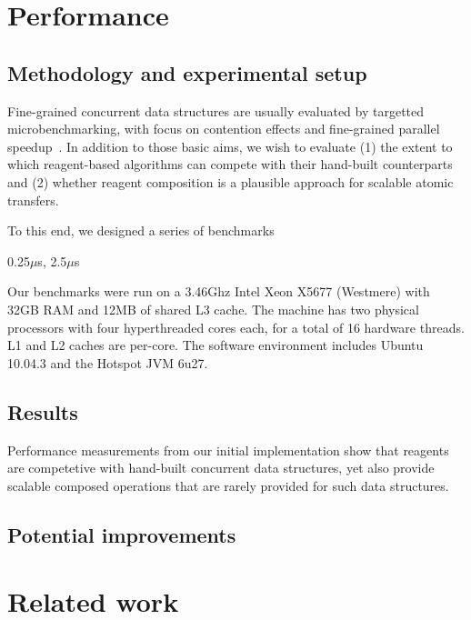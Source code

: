 \documentclass[preprint,nocopyrightspace]{sigplanconf}
\begin{document}
\section{Performance}
\label{sec:performance}

\subsection{Methodology and experimental setup}

Fine-grained concurrent data structures are usually evaluated by targetted
microbenchmarking, with focus on contention effects and fine-grained parallel
speedup~\cite{?}.  In addition to those basic aims, we wish to evaluate (1) the
extent to which reagent-based algorithms can compete with their hand-built
counterparts and (2) whether reagent composition is a plausible approach for
scalable atomic transfers.

To this end, we designed a series of benchmarks 

0.25$\mu$s, 2.5$\mu$s

Our benchmarks were run on a 3.46Ghz Intel Xeon X5677 (Westmere) with 32GB RAM
and 12MB of shared L3 cache.  The machine has two physical processors with
four hyperthreaded cores each, for a total of 16 hardware threads.  L1 and L2
caches are per-core.  The software environment includes Ubuntu 10.04.3 and
the Hotspot JVM 6u27.

\subsection{Results}

Performance measurements from our initial implementation show that reagents are
competetive with hand-built concurrent data structures, yet also provide
scalable composed operations that are rarely provided for such data structures.

\subsection{Potential improvements}




\section{Related work}
\label{sec:related}

\end{document}
